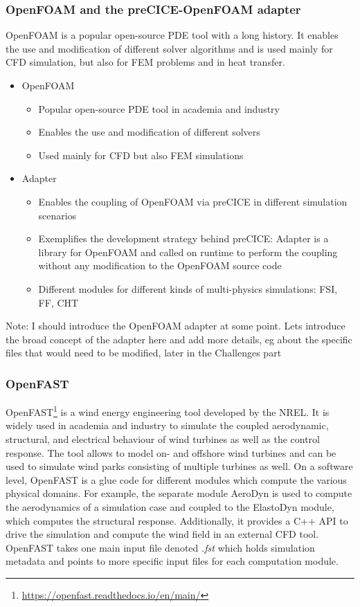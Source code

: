\subsubsection{OpenFOAM and the preCICE-OpenFOAM adapter}

OpenFOAM is a popular open-source PDE tool with a long history. It enables the use and modification of different solver algorithms and is used mainly for CFD simulation, but also for FEM problems and in heat transfer.

\begin{itemize}
	\item OpenFOAM
	\begin{itemize}
		\item Popular open-source PDE tool in academia and industry
		\item Enables the use and modification of different solvers
		\item Used mainly for CFD but also FEM simulations 
	\end{itemize}
	\item Adapter
	\begin{itemize}
		\item Enables the coupling of OpenFOAM via preCICE in different simulation scenarios
		\item Exemplifies the development strategy behind preCICE: Adapter is a library for OpenFOAM and called on runtime to perform the coupling without any modification to the OpenFOAM source code
		\item Different modules for different kinds of multi-physics simulations: FSI, FF, CHT
	\end{itemize}
\end{itemize}	
Note:
I should introduce the OpenFOAM adapter at some point.
Lets introduce the broad concept of the adapter here and add more details, eg about the specific files that would need to be modified, later in the Challenges part
\newline

\subsubsection{OpenFAST}
OpenFAST\footnote{\url{https://openfast.readthedocs.io/en/main/}} is a wind energy engineering tool developed by the NREL. It is widely used in academia and industry to simulate the coupled aerodynamic, structural, and electrical behaviour of wind turbines as well as the control response. The tool allows to model on- and offshore wind turbines and can be used to simulate wind parks consisting of multiple turbines as well. On a software level, OpenFAST is a glue code for different modules which compute the various physical domains. For example, the separate module AeroDyn is used to compute the aerodynamics of a simulation case and coupled to the ElastoDyn module, which computes the structural response. Additionally, it provides a C++ API to drive the simulation and compute the wind field in an external CFD tool. OpenFAST takes one main input file denoted \textit{.fst} which holds simulation metadata and points to more specific input files for each computation module.

